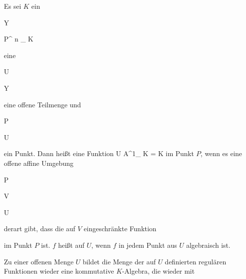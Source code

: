 {


Es sei $K$ ein


\mavergleichskette

{\vergleichskette

{Y
}

{ \subseteq }{ {\mathbb P}^{ n }_{ K}
}

{  }{
}

{    }{
}

{   }{
}

}
{}{}{}
eine


\mavergleichskette

{\vergleichskette

{U
}

{ \subseteq }{ Y
}

{  }{
}

{    }{
}

{   }{
}

}
{}{}{}
eine offene Teilmenge und


\mavergleichskette

{\vergleichskette

{P
}

{ \in }{ U
}

{  }{
}

{    }{
}

{   }{
}

}
{}{}{}
ein Punkt. Dann heißt eine Funktion
 { U } { {\mathbb A}^{1}_{ K } = K
} {}
 {} {}
im Punkt $P$, wenn es eine offene affine Umgebung


\mavergleichskettedisp

{\vergleichskette

{P
}

{ \in} { V
}

{ \subseteq} { U
}

{ } {
}

{ } {
}

}
{}{}{}
derart gibt, dass die auf $V$ eingeschränkte Funktion

im Punkt $P$ ist. $f$ heißt  auf $U$, wenn $f$ in jedem Punkt aus $U$ algebraisch ist.


}


Zu einer offenen Menge $U$ bildet die Menge der auf $U$ definierten regulären Funktionen wieder eine kommutative $K$-Algebra, die wieder mit

